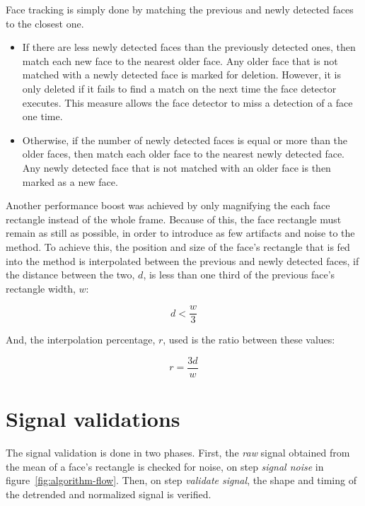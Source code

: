 Face tracking is simply done by matching the previous and newly detected faces
to the closest one.
\begin{itemize}
  \item If there are less newly detected faces than the previously detected
        ones, then match each new face to the nearest older face. Any older
        face that is not matched with a newly detected face is marked for
        deletion. However, it is only deleted if it fails to find a match
        on the next time the face detector executes. This measure allows the
        face detector to miss a detection of a face one time.
  \item Otherwise, if the number of newly detected faces is equal or more than
        the older faces, then match each older face to the nearest newly
        detected face. Any newly detected face that is not matched with an
        older face is then marked as a new face.
\end{itemize}

Another performance boost was achieved by only magnifying the each face
rectangle instead of the whole frame. Because of this, the face rectangle must
remain as still as possible, in order to introduce as few artifacts and noise
to the \evm{} method. To achieve this, the position and size of the face's
rectangle that is fed into the \evm{} method is interpolated between the
previous and newly detected faces, if the distance between the two, $d$,
is less than one third of the previous face's rectangle width, $w$:

\begin{equation}
  d < \frac{w}{3}
\end{equation}

And, the interpolation percentage, $r$, used is the ratio between these values:

\begin{equation}
  r = \frac{3d}{w}
\end{equation}

\section{Signal validations} \label{sec:impl:validations}

The signal validation is done in two phases. First, the \emph{raw} signal
obtained from the mean of a face's rectangle is checked for noise,
on step \emph{signal noise} in figure~\ref{fig:algorithm-flow}.
Then, on step \emph{validate signal}, the shape and timing of the detrended
and normalized signal is verified.

